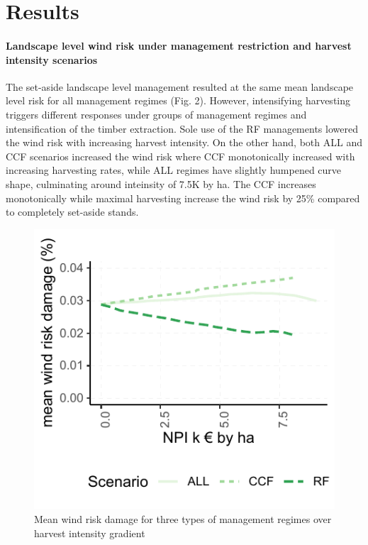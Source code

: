\documentclass[]{elsarticle} %
\makeatletter
\def\maxwidth{\ifdim\Gin@nat@width>\linewidth\linewidth
\else\Gin@nat@width\fi}
\let\Oldincludegraphics\includegraphics
\renewcommand{\includegraphics}[1]{\Oldincludegraphics[width=\maxwidth]{#1}}
\makeatother
\begin{document}
\section{Results}\label{results}

\paragraph{Landscape level wind risk under management restriction and
harvest intensity
scenarios}\label{landscape-level-wind-risk-under-management-restriction-and-harvest-intensity-scenarios}

The set-aside landscape level management resulted at the same mean
landscape level risk for all management regimes (Fig. 2). However,
intensifying harvesting triggers different responses under groups of
management regimes and intensification of the timber extraction. Sole
use of the RF managements lowered the wind risk with increasing harvest
intensity. On the other hand, both ALL and CCF scenarios increased the
wind risk where CCF monotonically increased with increasing harvesting
rates, while ALL regimes have slightly humpened curve shape, culminating
around inteinsity of 7.5K by ha. The CCF increases monotonically while
maximal harvesting increase the wind risk by 25\% compared to completely
set-aside stands.

\begin{figure}
\centering
\includegraphics{test_manus_files/figure-latex/fig3_mean_risk_by_intensity_plot-1.pdf}
\caption{Mean wind risk damage for three types of management regimes
over harvest intensity gradient}
\end{figure}
\end{document}
